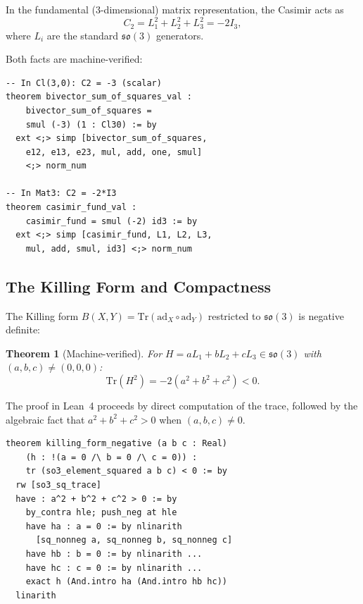 \documentclass[11pt]{article}
\newtheorem{theorem}{Theorem}[section]
\newcommand{\so}{\mathfrak{so}}
\newcommand{\Cl}{\mathrm{Cl}}
\newcommand{\ad}{\mathrm{ad}}
\newcommand{\Tr}{\mathrm{Tr}}
\begin{document}
In the fundamental (3-dimensional) matrix representation, the Casimir
acts as
\begin{equation}\label{eq:casimir-fund}
  C_2 = L_1^2 + L_2^2 + L_3^2 = -2 I_3,
\end{equation}
where $L_i$ are the standard $\so(3)$ generators.

Both facts are machine-verified:

\begin{lstlisting}[caption={Casimir computation in $\Cl(3,0)$ and the $3 \times 3$ representation (excerpts from \texttt{grade2\_lie\_algebra.lean} and \texttt{casimir\_eigenvalues.lean}).}]
-- In Cl(3,0): C2 = -3 (scalar)
theorem bivector_sum_of_squares_val :
    bivector_sum_of_squares =
    smul (-3) (1 : Cl30) := by
  ext <;> simp [bivector_sum_of_squares,
    e12, e13, e23, mul, add, one, smul]
    <;> norm_num

-- In Mat3: C2 = -2*I3
theorem casimir_fund_val :
    casimir_fund = smul (-2) id3 := by
  ext <;> simp [casimir_fund, L1, L2, L3,
    mul, add, smul, id3] <;> norm_num
\end{lstlisting}

\subsection{The Killing Form and Compactness}

The Killing form $B(X, Y) = \Tr(\ad_X \circ \ad_Y)$ restricted to
$\so(3)$ is negative definite:

\begin{theorem}[Machine-verified]\label{thm:killing-negative}
For $H = aL_1 + bL_2 + cL_3 \in \so(3)$ with $(a, b, c) \neq (0,0,0)$:
\begin{equation}\label{eq:killing}
  \Tr(H^2) = -2(a^2 + b^2 + c^2) < 0.
\end{equation}
\end{theorem}

\noindent The proof in Lean~4 proceeds by direct computation of the
trace, followed by the algebraic fact that $a^2 + b^2 + c^2 > 0$
when $(a,b,c) \neq 0$.

\begin{lstlisting}[caption={Killing form negativity (from \texttt{casimir\_spectral\_gap.lean}).}]
theorem killing_form_negative (a b c : Real)
    (h : !(a = 0 /\ b = 0 /\ c = 0)) :
    tr (so3_element_squared a b c) < 0 := by
  rw [so3_sq_trace]
  have : a^2 + b^2 + c^2 > 0 := by
    by_contra hle; push_neg at hle
    have ha : a = 0 := by nlinarith
      [sq_nonneg a, sq_nonneg b, sq_nonneg c]
    have hb : b = 0 := by nlinarith ...
    have hc : c = 0 := by nlinarith ...
    exact h (And.intro ha (And.intro hb hc))
  linarith
\end{lstlisting}
\end{document}

